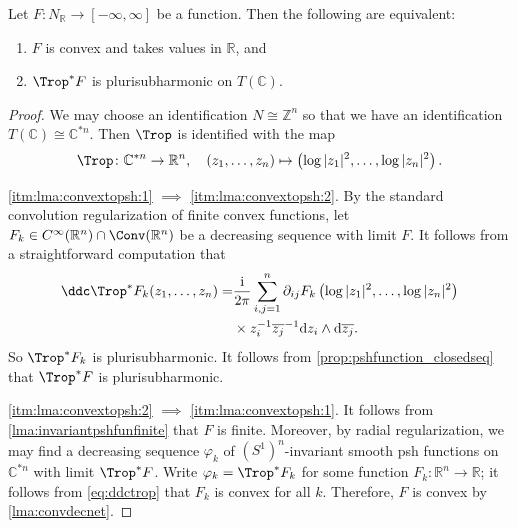 \begin{lemma}\label{lma:convextopsh}
    Let $F\colon N_{\mathbb{R}}\rightarrow [-\infty,\infty]$ be a function. Then the following are equivalent:
    \begin{enumerate}
        \item\label{itm:lma:convextopsh:1} $F$ is convex and takes values in $\mathbb{R}$, and
        \item\label{itm:lma:convextopsh:2} $\Trop^*F$ is plurisubharmonic on $T(\mathbb{C})$.
    \end{enumerate}
\end{lemma}
\begin{proof}
We may choose an identification $N\cong \mathbb{Z}^n$ so that we have an identification $T(\mathbb{C})\cong \mathbb{C}^{*n}$.
Then $\Trop$ is identified with the map
\[
\Trop\colon \mathbb{C}^{*n}\rightarrow \mathbb{R}^n,\quad (z_1,\ldots,z_n)\mapsto \left(\log|z_1|^2,\ldots,\log|z_n|^2\right).
\]

\ref{itm:lma:convextopsh:1} $\implies$ \ref{itm:lma:convextopsh:2}. By the standard convolution regularization of finite convex functions, let $F_k\in C^{\infty}(\mathbb{R}^n)\cap \Conv(\mathbb{R}^n)$ be a decreasing sequence with limit $F$. It follows from a straightforward computation that
    \begin{equation}\label{eq:ddctrop}
    \begin{split}
    \ddc \Trop^*F_k(z_1,\ldots,z_n)
    =&\frac{\mathrm{i}}{2\pi} \sum_{i,j=1}^n \partial_{ij}F_k\left(\log|z_1|^2,\ldots,\log|z_n|^2\right)\\
    &\times z_i^{-1}\overline{z_j}^{-1}\mathrm{d}z_i\wedge \mathrm{d}\overline{z_j}.
    \end{split}
    \end{equation}
    So $\Trop^* F_k$ is plurisubharmonic. It follows from \cref{prop:pshfunction_closedseq} that $\Trop^* F$ is plurisubharmonic.

\ref{itm:lma:convextopsh:2} $\implies$ \ref{itm:lma:convextopsh:1}. It follows from \cref{lma:invariantpshfunfinite} that $F$ is finite. Moreover, by radial regularization, we may find a decreasing sequence $\varphi_k$ of $(S^1)^n$-invariant smooth psh functions on $\mathbb{C}^{*n}$ with limit $\Trop^*F$. Write $\varphi_k=\Trop^* F_k$ for some function $F_k\colon \mathbb{R}^n\rightarrow \mathbb{R}$; it follows from \eqref{eq:ddctrop} that $F_k$ is convex for all $k$. Therefore, $F$ is convex by \cref{lma:convdecnet}.
\end{proof}

